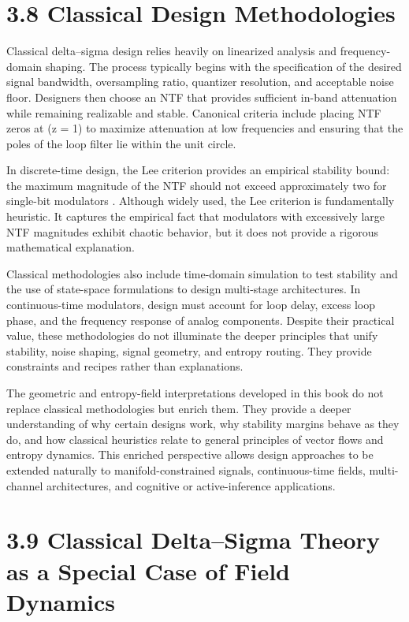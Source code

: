 \section*{3.8 Classical Design Methodologies}

Classical delta--sigma design relies heavily on linearized analysis and frequency-domain shaping. The process typically begins with the specification of the desired signal bandwidth, oversampling ratio, quantizer resolution, and acceptable noise floor. Designers then choose an NTF that provides sufficient in-band attenuation while remaining realizable and stable. Canonical criteria include placing NTF zeros at (z = 1) to maximize attenuation at low frequencies and ensuring that the poles of the loop filter lie within the unit circle.

In discrete-time design, the Lee criterion provides an empirical stability bound: the maximum magnitude of the NTF should not exceed approximately two for single-bit modulators \citep{schreier2005understanding}. Although widely used, the Lee criterion is fundamentally heuristic. It captures the empirical fact that modulators with excessively large NTF magnitudes exhibit chaotic behavior, but it does not provide a rigorous mathematical explanation.

Classical methodologies also include time-domain simulation to test stability and the use of state-space formulations to design multi-stage architectures. In continuous-time modulators, design must account for loop delay, excess loop phase, and the frequency response of analog components. Despite their practical value, these methodologies do not illuminate the deeper principles that unify stability, noise shaping, signal geometry, and entropy routing. They provide constraints and recipes rather than explanations.

The geometric and entropy-field interpretations developed in this book do not replace classical methodologies but enrich them. They provide a deeper understanding of why certain designs work, why stability margins behave as they do, and how classical heuristics relate to general principles of vector flows and entropy dynamics. This enriched perspective allows design approaches to be extended naturally to manifold-constrained signals, continuous-time fields, multi-channel architectures, and cognitive or active-inference applications.

\section*{3.9 Classical Delta--Sigma Theory as a Special Case of Field Dynamics}

